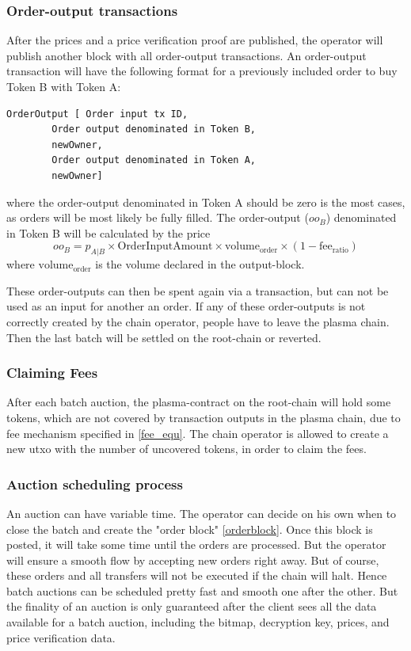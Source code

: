 \documentclass[11pt,parskip=full]{scrartcl}%
\begin{document}
\subsubsection{Order-output transactions} After the prices and a price verification proof are published, the operator will publish another block with all order-output transactions. An order-output transaction will have the following format for a previously included order to buy Token B with Token A:
\begin{lstlisting}
OrderOutput [ Order input tx ID,
		Order output denominated in Token B, 
		newOwner,
		Order output denominated in Token A,
		newOwner]

\end{lstlisting}
where the order-output denominated in Token A should be zero is the most cases, as orders will be most likely be fully filled.
The order-output ($oo_B$) denominated in Token B will be calculated by the price 
\begin{equation}
	oo_B = p_{A|B} \times \text{OrderInputAmount} \times \text{volume}_{\text{order}} \times (1-\text{fee}_{\text{ratio}})
    \label{fee_equ}
\end{equation}
where $\text{volume}_{\text{order}}$ is the volume declared in the output-block.  

These order-outputs can then be spent again via a transaction, but can not be used as an input for another an order.
If any of these order-outputs is not correctly created by the chain operator, people have to leave the plasma chain. Then the last batch will be settled on the root-chain or reverted.

\subsubsection{Claiming Fees} After each batch auction, the plasma-contract on the root-chain will hold some tokens, which are not covered by transaction outputs in the plasma chain, due to fee mechanism specified in \ref{fee_equ}. The chain operator is allowed to create a new utxo with the number of uncovered tokens, in order to claim the fees.

\subsubsection{Auction scheduling process}
An auction can have variable time. The operator can decide on his own when to close the batch and create the "order block" \ref{orderblock}. Once this block is posted, it will take some time until the orders are processed. But the operator will ensure a smooth flow by accepting new orders right away. But of course, these orders and all transfers will not be executed if the chain will halt.
Hence batch auctions can be scheduled pretty fast and smooth one after the other. But the finality of an auction is only guaranteed after the client sees all the data available for a batch auction, including the bitmap, decryption key, prices, and price verification data.  
\end{document}
